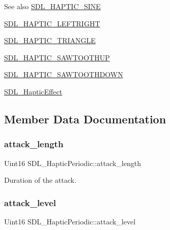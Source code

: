 \begin{DoxySeeAlso}{See also}
\mbox{\hyperlink{_s_d_l__haptic_8h_aa6d75adbfcdda5075078e7a2849da5c0}{S\+D\+L\+\_\+\+H\+A\+P\+T\+I\+C\+\_\+\+S\+I\+NE}} 

\mbox{\hyperlink{_s_d_l__haptic_8h_ae047624d8458ff6400887c37a36f86d3}{S\+D\+L\+\_\+\+H\+A\+P\+T\+I\+C\+\_\+\+L\+E\+F\+T\+R\+I\+G\+HT}} 

\mbox{\hyperlink{_s_d_l__haptic_8h_ae8123eaa51511507375ba6ef9220fa46}{S\+D\+L\+\_\+\+H\+A\+P\+T\+I\+C\+\_\+\+T\+R\+I\+A\+N\+G\+LE}} 

\mbox{\hyperlink{_s_d_l__haptic_8h_ab8e3f40f3c2bcee8905d13b634363c3f}{S\+D\+L\+\_\+\+H\+A\+P\+T\+I\+C\+\_\+\+S\+A\+W\+T\+O\+O\+T\+H\+UP}} 

\mbox{\hyperlink{_s_d_l__haptic_8h_afd64aa747034a7ccf4b55f6246525701}{S\+D\+L\+\_\+\+H\+A\+P\+T\+I\+C\+\_\+\+S\+A\+W\+T\+O\+O\+T\+H\+D\+O\+WN}} 

\mbox{\hyperlink{union_s_d_l___haptic_effect}{S\+D\+L\+\_\+\+Haptic\+Effect}} 
\end{DoxySeeAlso}


\subsection{Member Data Documentation}
\mbox{\label{struct_s_d_l___haptic_periodic_ab35eedce7107edc75640586159fe75bb}} 
\subsubsection{\texorpdfstring{attack\_length}{attack\_length}}
{\footnotesize\ttfamily Uint16 S\+D\+L\+\_\+\+Haptic\+Periodic\+::attack\+\_\+length}

Duration of the attack. \mbox{\label{struct_s_d_l___haptic_periodic_a79fc2217fea6db6ab3d89ad905d52ccb}} 
\subsubsection{\texorpdfstring{attack\_level}{attack\_level}}
{\footnotesize\ttfamily Uint16 S\+D\+L\+\_\+\+Haptic\+Periodic\+::attack\+\_\+level}

